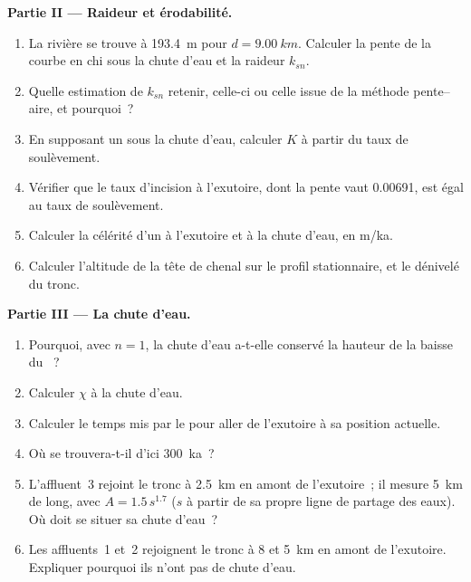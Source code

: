 \begin{problem}
\medskip\noindent\textbf{Partie II --- Raideur et érodabilité.}
\begin{enumerate}[resume]
\item La rivière se trouve à \qty{193.4}{m} pour $d = \qty{9.00}{km}$. Calculer la
  pente de la courbe en chi sous la chute d'eau et la raideur $k_{sn}$.
\item Quelle estimation de $k_{sn}$ retenir, celle-ci ou celle issue de la
  méthode pente--aire, et pourquoi~?
\item En supposant un  sous la chute d'eau, calculer $K$ à partir du
  taux de soulèvement.
\item Vérifier que le taux d'incision à l'exutoire, dont la pente vaut
  0.00691, est égal au taux de soulèvement.
\item Calculer la célérité d'un  à l'exutoire et à la
  chute d'eau, en m/ka.
\item Calculer l'altitude de la tête de chenal sur le profil stationnaire, et
  le dénivelé du tronc.
\end{enumerate}

\medskip\noindent\textbf{Partie III --- La chute d'eau.}
\begin{enumerate}[resume]
\item Pourquoi, avec $n = 1$, la chute d'eau a-t-elle conservé la hauteur de la
  baisse du ~?
\item Calculer $\chi$ à la chute d'eau.
\item Calculer le temps mis par le  pour aller de l'exutoire à sa
  position actuelle.
\item Où se trouvera-t-il d'ici \qty{300}{ka}~?
\item L'affluent~3 rejoint le tronc à \qty{2.5}{km} en amont de l'exutoire~; il
  mesure \qty{5}{km} de long, avec $A = 1.5\,s^{1.7}$ ($s$ à partir de sa propre
  ligne de partage des eaux). Où doit se situer sa chute d'eau~?
\item Les affluents~1 et~2 rejoignent le tronc à 8 et \qty{5}{km} en amont de
  l'exutoire. Expliquer pourquoi ils n'ont pas de chute d'eau.
\end{enumerate}


\end{problem}
